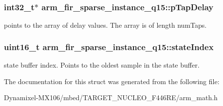 \subsubsection[{\texorpdfstring{p\+Tap\+Delay}{pTapDelay}}]{\setlength{\rightskip}{0pt plus 5cm}int32\+\_\+t$\ast$ arm\+\_\+fir\+\_\+sparse\+\_\+instance\+\_\+q15\+::p\+Tap\+Delay}\hypertarget{structarm__fir__sparse__instance__q15_aeab2855176c6efdb231a73a3672837d5}{}\label{structarm__fir__sparse__instance__q15_aeab2855176c6efdb231a73a3672837d5}
points to the array of delay values. The array is of length num\+Taps. 
\subsubsection[{\texorpdfstring{state\+Index}{stateIndex}}]{\setlength{\rightskip}{0pt plus 5cm}uint16\+\_\+t arm\+\_\+fir\+\_\+sparse\+\_\+instance\+\_\+q15\+::state\+Index}\hypertarget{structarm__fir__sparse__instance__q15_a89487f28cab52637426024005e478985}{}\label{structarm__fir__sparse__instance__q15_a89487f28cab52637426024005e478985}
state buffer index. Points to the oldest sample in the state buffer. 

The documentation for this struct was generated from the following file\+:\begin{DoxyCompactItemize}
\item 
Dynamixel-\/\+M\+X106/mbed/\+T\+A\+R\+G\+E\+T\+\_\+\+N\+U\+C\+L\+E\+O\+\_\+\+F446\+R\+E/arm\+\_\+math.\+h\end{DoxyCompactItemize}
